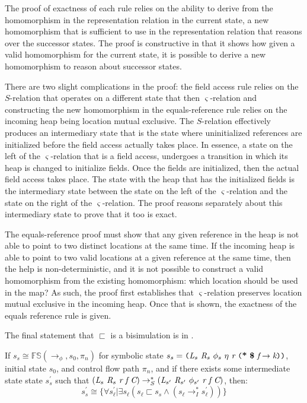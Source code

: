 The proof of exactness of each rule relies on the ability to derive
from the homomorphism in the representation relation in the current
state, a new homomorphism that is sufficient to use in the
representation relation that reasons over the successor states. The
proof is constructive in that it shows how given a valid homomorphism
for the current state, it is possible to derive a new homomorphism to
reason about successor states.

There are two slight complications in the proof: the field access rule
relies on the $S$-relation that operates on a different state that
then $\varsigma$-relation and constructing the new homomorphism in the
equals-reference rule relies on the incoming heap being location
mutual exclusive. The $S$-relation effectively produces an
intermediary state that is the state where uninitialized references
are initialized before the field access actually takes place. In
essence, a state on the left of the $\varsigma$-relation that is a
field access, undergoes a transition in which its heap is changed to
initialize fields. Once the fields are initialized, then the actual
field access takes place. The state with the heap that has the
initialized fields is the intermediary state between the state on the
left of the $\varsigma$-relation and the state on the right of the
$\varsigma$-relation. The proof reasons separately about this
intermediary state to prove that it too is exact.

The equals-reference proof must show that any given reference in the
heap is not able to point to two distinct locations at the same
time. If the incoming heap is able to point to two valid locations at
a given reference at the same time, then the help is
non-deterministic, and it is not possible to construct a valid
homomorphism from the existing homomorphism: which location should be
used in the map? As such, the proof first establishes that
$\varsigma$-relation preserves location mutual exclusive in the
incoming heap. Once that is shown, the exactness of the equals
reference rule is given.

The final statement that $\sqsubset$ is a bisimulation is in .

\begin{lemma}
\label{lem:init}
If $s_s \cong \mathbb{FS}(\rightarrow_{\phi},s_0,\pi_n)$ for symbolic state $s_s = \lp \cfgnt{L}_s\ \cfgnt{R}_{s}\ \phi_s\ \eta\ \cfgnt{r}\ \lp \cfgt{*}\ \cfgt{\$}\ \cfgnt{f} \rightarrow \cfgnt{k}\rp \rp$, initial state $s_0$, and control flow path $\pi_n$, and if there exists some intermediate state state $s_s^\prime$ such that $(\cfgnt{L}_s\ \cfgnt{R}_{s}\ \cfgnt{r}\ \cfgnt{f} \ \cfgnt{C}) \rightarrow_S^* (\cfgnt{L}_{s^\prime}\ \cfgnt{R}_{s^\prime}\ \phi_{s^\prime}\ \cfgnt{r}\ \cfgnt{f} \ \cfgnt{C})$, then:
 $$s_s^\prime \cong \{\forall s_\ell^\prime | \exists s_\ell (s_\ell \sqsubset s_s \wedge (s_\ell \rightarrow_I^* s_\ell^\prime) ) \}$$
\end{lemma}

